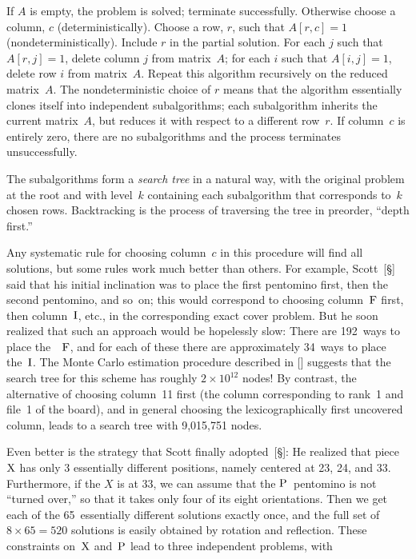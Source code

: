 \bigbreak
\begingroup\obeylines
If $A$ is empty, the problem is solved; terminate successfully.
Otherwise choose a column, $c$ (deterministically).
Choose a row, $r$, such that $A[r,c]=1$ (nondeterministically).
Include $r$ in the partial solution.
For each $j$ such that $A[r,j]=1$,
\qquad delete column $j$ from matrix~$A$;
\qquad for each $i$ such that $A[i,j]=1$,
\qquad\qquad delete row $i$ from matrix~$A$.
Repeat this algorithm recursively on the reduced matrix~$A$.
\endgroup
\bigbreak\noindent
The nondeterministic choice of $r$ means that the algorithm
essentially clones itself into independent subalgorithms; each
subalgorithm inherits the current matrix~$A$, but reduces it with
respect to a different row~$r$.  If column~$c$ is entirely zero, there
are no subalgorithms and the process terminates unsuccessfully.

The
subalgorithms form a {\it search tree\/} in a natural way, with the
original problem at the root and with level~$k$ containing each subalgorithm
that corresponds to~$k$ chosen rows.  Backtracking is the
process of traversing the tree in preorder, ``depth first.''

Any systematic rule for choosing column~$c$ in this procedure will
find all solutions, but some rules work much better than others.  For
example, Scott~[\S] said that his initial inclination was to place the first
pentomino first, then the second pentomino, and so~on; this would
correspond to choosing column~${\rm F}$ first, then column~${\rm I}$,
etc., in the corresponding exact cover problem.  But he soon realized
that such an approach would be hopelessly slow: There are 192~ways to
place the~~${\rm F}$, and for each of these there are approximately
34~ways to place the~${\rm I}$.  The Monte Carlo estimation procedure
described in [\MC] suggests that the search tree for this scheme has
roughly $2\times10^{12}$ nodes!  By contrast, the alternative of
choosing column~11 first (the column corresponding to rank~1 and
file~1 of the board), and in general choosing the
lexicographically first uncovered column, leads to a search tree with
9{,}015{,}751 nodes.

Even better is the strategy that Scott finally adopted~[\S]:
He realized that piece~${\rm X}$ has only 3 essentially
different positions, namely centered at 23, 24, and 33.  Furthermore,
if the $X$ is at 33, we can assume that the ${\rm P}$~pentomino is not
``turned over,'' so that it takes only four of its eight orientations.
Then we get each of the 65~essentially different solutions exactly
once, and the full set of $8\times65=520$ solutions is easily obtained
by rotation and reflection.  These constraints on~${\rm X}$ and~${\rm
P}$ lead to three independent problems, with

